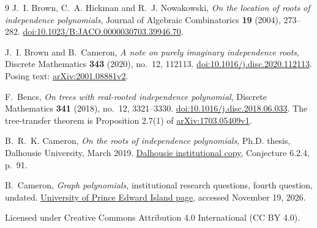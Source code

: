 \documentclass[11pt]{article}
\begin{document}
\begin{thebibliography}{9}
J.~I. Brown, C.~A. Hickman and R.~J. Nowakowski,
\emph{On the location of roots of independence polynomials},
Journal of Algebraic Combinatorics \textbf{19} (2004), 273--282.
\href{https://doi.org/10.1023/B:JACO.0000030703.39946.70}{doi:10.1023/B:JACO.0000030703.39946.70}.

J.~I. Brown and B.~Cameron,
\emph{A note on purely imaginary independence roots},
Discrete Mathematics \textbf{343} (2020), no.~12, 112113.
\href{https://doi.org/10.1016/j.disc.2020.112113}{doi:10.1016/j.disc.2020.112113}.
Posing text: \href{https://arxiv.org/abs/2001.08881v2}{arXiv:2001.08881v2}.

F.~Bencs, \emph{On trees with real-rooted independence polynomial},
Discrete Mathematics \textbf{341} (2018), no.~12, 3321--3330.
\href{https://doi.org/10.1016/j.disc.2018.06.033}{doi:10.1016/j.disc.2018.06.033}.
The tree-transfer theorem is Proposition 2.7(1) of
\href{https://arxiv.org/abs/1703.05409v1}{arXiv:1703.05409v1}.

B.~R.~K. Cameron, \emph{On the roots of independence polynomials},
Ph.D. thesis, Dalhousie University, March 2019.
\href{https://dalspace.library.dal.ca/server/api/core/bitstreams/c903bf10-142c-4ffe-965a-1927ad52197a/content}{Dalhousie institutional copy},
Conjecture 6.2.4, p.~91.

B.~Cameron, \emph{Graph polynomials}, institutional research questions,
fourth question, undated.
\href{https://www.smcs.upei.ca/~brcameron/graphpolys.html}{University of Prince Edward Island page},
accessed November 19, 2026.
\end{thebibliography}
\smallskip
\noindent\small Licensed under Creative Commons Attribution 4.0 International
(CC BY 4.0).
\end{document}
